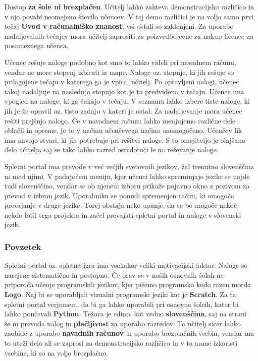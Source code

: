 Dostop \textbf{za šole ni brezplačen}. Učitelj lahko zahteva
demonstracijsko različico in v njo povabi neomejeno število učencev. V
tej demo različici je na voljo samo prvi tečaj \textbf{Uvod v
  računalniško znanost}, vsi ostali so zaklenjeni. Za uporabo
nadaljevalnih tečajev mora učitelj zaprositi za poizvedbo cene za nakup
licence za posameznega učenca.

Učenec rešuje naloge podobno kot smo to lahko videli pri navadnem
računu, vendar ne more stopenj izbirati iz mape. Naloge oz. stopnje,
ki jih rešuje so prilagojene tečaju v katerega ga je vpisal
učitelj. Po opravljeni nalogi, učenec takoj nadaljuje na naslednjo
stopnjo kot je ta predvidena v tečaju. Učenec ima vpogled na naloge,
ki ga čakajo v tečaju. V seznamu lahko izbere tiste naloge, ki jih je
že opravil oz. tisto zadnjo v kateri je ostal. Za nadaljevanje mora
učenec rešiti prejšnjo nalogo. Če v navadnem računu lahko menjujemo
različne dele oblačil in opreme, je to v načinu učenčevega načina
onemogočeno. Učenčev lik ima navojo stvari, ki jih potrebuje pri
rešitvi naloge. S to omejitvijo je olajšano delo učitelja saj se tako
lahko razred osredotoči le na reševanje naloge.


 Spletni portal ima prevode v več večjih svetovnih jezikov, žal
 trenutno slovenščina ni med njimi. V padajočem meniju, kjer učenci
 lahko spreminjajo jezike se najde tudi slovenščino, vendar se ob
 njenem izboru prikaže pojavno okno z pozivom za prevod v izbran
 jezik. Uporabniku se ponudi spremenjen račun, ki omogoča prevajanje v
 druge jezike. Torej obstaja neko upanje, da se bo mogoče nekoč nekdo
 lotil tega projekta in začel prevajati spletni portal in naloge v
 slovenski jezik. 

\subsubsection{Povzetek}
\label{sec:povzetek:codecombat}

Spletni portal oz. spletna igra ima vsekakor veliki motivacijski
faktor. Naloge so narejene sistematično in postopno. Če prav se v
naših osnovnih šolah ne priporoča učenje programskih jezikov, kjer
pišemo programsko kodo razen morda \textbf{Logo}. Naj bi se
uporabljali vizualni programski jeziki kot je \textbf{Scratch}. Za ta
spletni portal verjamem, da bi ga lahko uporabili pri osnovno šolcih,
kater bi lahko poučevali \textbf{Python}. Težava je edino, kot vedno
\textbf{slovenščina}, saj na strani še ni prevoda nalog in
\textbf{plačljivost} za uporabo razredov. To učitelj sicer lahko
zaobide z uporabo \textbf{navadnih računov} in uporabo brezplačnih
vsebin, vendar mu to uteži delo ali se zaprosi za demonstracijsko
različico in v ta name izkoristi vsebine, ki so na voljo brezplačno. 

